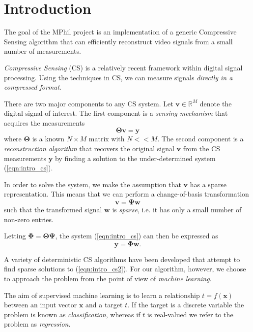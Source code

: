 \chapter{Introduction}
The goal of the MPhil project is an implementation of a generic Compressive Sensing algorithm that can efficiently reconstruct video signals from a small number of measurements.

\emph{Compressive Sensing} (CS) \cite{candes2006, donoho2006} is a relatively recent framework within digital signal processing.
Using the techniques in CS, we can measure signals \emph{directly in a compressed format}.

There are two major components to any CS system.
Let $\bm v \in\mathbb{R}^M$ denote the digital signal of interest.
The first component is a \emph{sensing mechanism} that acquires the measurements
\begin{equation}
  \label{eqn:intro_cs}
  \bm\Theta\bm v = \bm y
\end{equation}
where $\bm\Theta$ is a known $N\times M$ matrix with $N<<M$.
The second component is a \emph{reconstruction algorithm} that recovers the original signal $\bm v$ from the CS measurements $\bm y$ by finding a solution to the under-determined system (\ref{eqn:intro_cs}).

In order to solve the system, we make the assumption that $\bm v$ has a sparse representation.
This means that we can perform a change-of-basis transformation
\begin{equation}
  \label{eqn:intro_basis}
  \bm v = \bm\Psi\bm w
\end{equation}
such that the transformed signal $\bm w$ is \emph{sparse}, i.e. it has only a small number of non-zero entries.

Letting $\bm\Phi=\bm\Theta\bm\Psi$, the system (\ref{eqn:intro_cs}) can then be expressed as
\begin{equation}
  \label{eqn:intro_cs2}
  \bm y = \bm\Phi\bm w.
\end{equation}

A variety of deterministic CS algorithms have been developed that attempt to find sparse solutions to (\ref{eqn:intro_cs2}).
For our algorithm, however, we choose to approach the problem from the point of view of \emph{machine learning}.

The aim of supervised machine learning is to learn a relationship $t = f(\bm x)$ between an input vector $\bm x$ and a target $t$.
If the target is a discrete variable the problem is known as \emph{classification}, whereas if $t$ is real-valued we refer to the problem as \emph{regression}.

